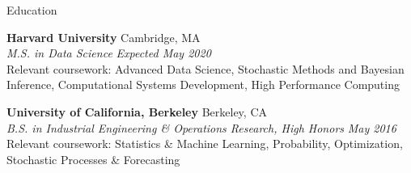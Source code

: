 \documentclass{resume} %
\begin{document}

\begin{rSection}{Education}

{\bf Harvard University} \hfill { Cambridge, MA}
\\ {\em M.S. in Data Science} \hfill {\em Expected May 2020}
\\ Relevant coursework: Advanced Data Science, Stochastic Methods and Bayesian Inference, Computational Systems Development, High Performance Computing

{\bf University of California, Berkeley} \hfill {Berkeley, CA}
\\ {\em B.S. in Industrial Engineering \& Operations Research, High Honors} \hfill {\em May 2016}
\\ Relevant coursework: Statistics \& Machine Learning, Probability, Optimization, Stochastic Processes \& Forecasting


\end{rSection}

\end{document}

